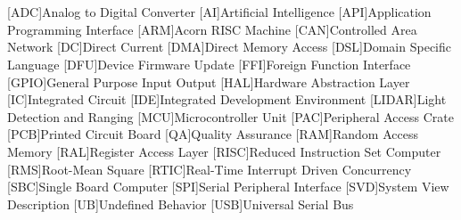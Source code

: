 \cleardoublepage
\chapter*{\listofabbrevname}
{}

\begin{acronym}[KolikMista]

	[ADC]{Analog to Digital Converter}
	[AI]{Artificial Intelligence}
	[API]{Application Programming Interface}
	[ARM]{Acorn RISC Machine}
	[CAN]{Controlled Area Network}
	[DC]{Direct Current}
	[DMA]{Direct Memory Access}
	[DSL]{Domain Specific Language}
	[DFU]{Device Firmware Update}
	[FFI]{Foreign Function Interface}
	[GPIO]{General Purpose Input Output}
	[HAL]{Hardware Abstraction Layer}
	[IC]{Integrated Circuit}
	[IDE]{Integrated Development Environment}
	[LIDAR]{Light Detection and Ranging}
	[MCU]{Microcontroller Unit}
	[PAC]{Peripheral Access Crate}
	[PCB]{Printed Circuit Board}
	[QA]{Quality Assurance}
	[RAM]{Random Access Memory}
	[RAL]{Register Access Layer}
	[RISC]{Reduced Instruction Set Computer}
	[RMS]{Root-Mean Square}
	[RTIC]{Real-Time Interrupt Driven Concurrency}
	[SBC]{Single Board Computer}
	[SPI]{Serial Peripheral Interface}
	[SVD]{System View Description}
	[UB]{Undefined Behavior}
	[USB]{Universal Serial Bus}


\end{acronym}
